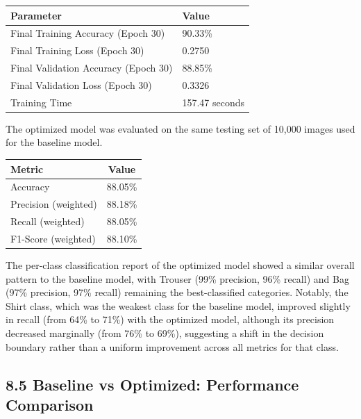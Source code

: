 \documentclass[11pt,a4paper]{article}
\begin{document}
\begin{center}
\begin{tabular}{|p{6cm}|p{6cm}|}
\hline
\textbf{Parameter} & \textbf{Value}\\
\hline
Final Training Accuracy (Epoch 30) & 90.33\%\\
\hline
Final Training Loss (Epoch 30) & 0.2750\\
\hline
Final Validation Accuracy (Epoch 30) & 88.85\%\\
\hline
Final Validation Loss (Epoch 30) & 0.3326\\
\hline
Training Time & 157.47 seconds\\
\hline
\end{tabular}
\end{center}

\vspace{0.15cm}

The optimized model was evaluated on the same testing set of 10{,}000 images used for the baseline model.

\begin{center}
\begin{tabular}{|p{6cm}|c|}
\hline
\textbf{Metric} & \textbf{Value}\\
\hline
Accuracy & 88.05\%\\
\hline
Precision (weighted) & 88.18\%\\
\hline
Recall (weighted) & 88.05\%\\
\hline
F1-Score (weighted) & 88.10\%\\
\hline
\end{tabular}
\end{center}

\vspace{0.15cm}

The per-class classification report of the optimized model showed a similar overall pattern to the baseline model, with Trouser (99\% precision, 96\% recall) and Bag (97\% precision, 97\% recall) remaining the best-classified categories. Notably, the Shirt class, which was the weakest class for the baseline model, improved slightly in recall (from 64\% to 71\%) with the optimized model, although its precision decreased marginally (from 76\% to 69\%), suggesting a shift in the decision boundary rather than a uniform improvement across all metrics for that class.


\subsection*{8.5 Baseline vs Optimized: Performance Comparison}
\end{document}
